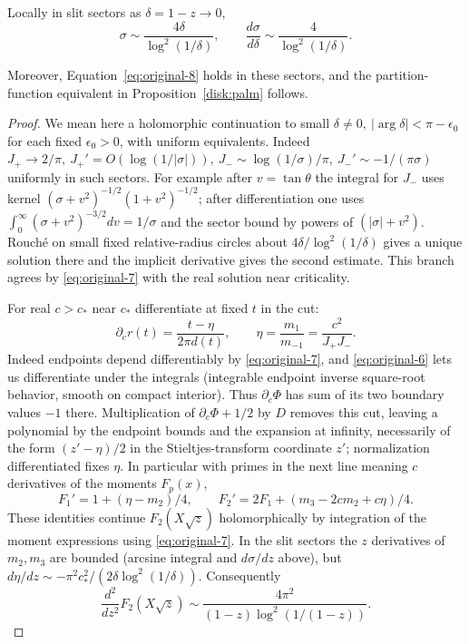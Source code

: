 \begin{lemma}\label{disk:singularity}

Locally in slit sectors as \(\delta=1-z\to0\),
\[
 \sigma\sim \frac{4\delta}{\log^2(1/\delta)},\qquad
 \frac{d\sigma}{d\delta}\sim\frac4{\log^2(1/\delta)}.
\]

Moreover, Equation~\eqref{eq:original-8} holds in these sectors, and the partition-function equivalent in Proposition~\ref{disk:palm} follows.
\end{lemma}\begin{proof}

We mean here a holomorphic continuation to small \(\delta\ne0,\ |\arg\delta|<\pi-\epsilon_0\) for each fixed \(\epsilon_0>0\), with uniform equivalents.
Indeed \(J_+\to2/\pi,\ J_+'=O(\log(1/|\sigma|)),\ J_-\sim\log(1/\sigma)/\pi,\ J_-'\sim-1/(\pi\sigma)\) uniformly in such sectors.
For example after \(v=\tan\theta\) the integral for \(J_-\) uses kernel \((\sigma+v^2)^{-1/2}(1+v^2)^{-1/2}\); after differentiation one uses \(\int_0^\infty(\sigma+v^2)^{-3/2}dv=1/\sigma\) and the sector bound by powers of \((|\sigma|+v^2)\).
Rouché on small fixed relative-radius circles about \(4\delta/\log^2(1/\delta)\) gives a unique solution there and the implicit derivative gives the second estimate.
This branch agrees by \eqref{eq:original-7} with the real solution near criticality.

For real \(c>c_*\) near \(c_*\) differentiate at fixed \(t\) in the cut:
\[
 \partial_c r(t)=\frac{t-\eta}{2\pi d(t)},\qquad
 \eta=\frac{m_1}{m_{-1}}=\frac{c^2}{J_+ J_-}.
\]
Indeed endpoints depend differentiably by \eqref{eq:original-7}, and \eqref{eq:original-6} lets us differentiate under the integrals (integrable endpoint inverse square-root behavior, smooth on compact interior).
Thus \(\partial_c\Phi\) has sum of its two boundary values \(-1\) there.
Multiplication of \(\partial_c\Phi+1/2\) by \(D\) removes this cut, leaving a polynomial by the endpoint bounds and the expansion at infinity, necessarily of the form \((z'-\eta)/2\) in the Stieltjes-transform coordinate \(z'\); normalization differentiated fixes \(\eta\).
In particular with primes in the next line meaning \(c\) derivatives of the moments \(F_p(x)\),
\[
 F_1'=1+(\eta-m_2)/4,\qquad F_2'=2F_1+(m_3-2c m_2+c\eta)/4.
\]
These identities continue \(F_2(X\sqrt z)\) holomorphically by integration of the moment expressions using \eqref{eq:original-7}.
In the slit sectors the \(z\) derivatives of \(m_2,m_3\) are bounded (arcsine integral and \(d\sigma/dz\) above), but \(d\eta/dz\sim-\pi^2 c_*^2/(2\delta\log^2(1/\delta))\).
Consequently
\begin{equation}
\frac{d^2}{dz^2}F_2(X\sqrt z)\sim
 \frac{4\pi^2}{(1-z)\log^2(1/(1-z))}.
 \label{eq:original-8}
\end{equation}


\end{proof}
